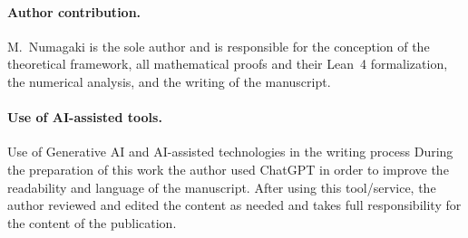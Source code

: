 \documentclass[sn-mathphys-num,Numbered]{sn-jnl}
\theoremstyle{thmstyleone}
\theoremstyle{thmstylethree}
\theoremstyle{thmstyletwo}
\begin{document}
\paragraph{Author contribution.}
M.~Numagaki is the sole author and is responsible for the
conception of the theoretical framework,
all mathematical proofs and their Lean~4 formalization,
the numerical analysis, and the writing of the manuscript.

\paragraph{Use of AI-assisted tools.}
Use of Generative AI and AI-assisted technologies in the writing process
During the preparation of this work the author used ChatGPT in order to improve the readability and language of the manuscript. After using this tool/service, the author reviewed and edited the content as needed and takes full responsibility for the content of the publication.
\end{document}
